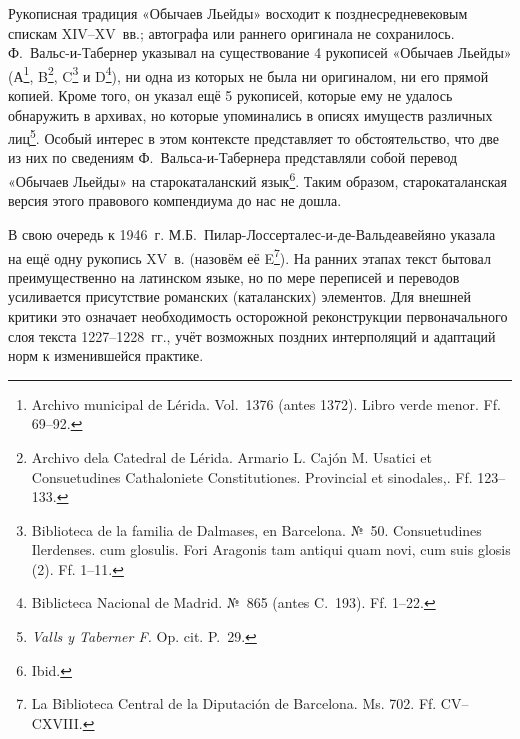 Рукописная традиция «Обычаев Льейды» восходит к позднесредневековым спискам XIV--XV~вв.; автографа или раннего оригинала не сохранилось. Ф.~Вальс-и-Табернер указывал на существование 4 рукописей «Обычаев Льейды» (А\footnote{Archivo municipal de Lérida. Vol.~1376 (antes 1372). Libro verde menor. Ff. 69--92.}, B\footnote{Archivo dela Catedral de Lérida. Armario L. Cajón M. Usatici et Consuetudines Cathaloniete Constitutiones. Provincial et sinodales,. Ff. 123--133.}, C\footnote{Biblioteca de la familia de Dalmases, en Barcelona. №~50. Consuetudines Ilerdenses. cum glosulis. Fori Aragonis tam antiqui quam novi, cum suis glosis (2). Ff. 1--11.} и D\footnote{Biblicteca Nacional de Madrid. №~865 (antes C.~193). Ff. 1--22.}), ни одна из которых не была ни оригиналом, ни его прямой копией. Кроме того, он указал ещё 5 рукописей, которые ему не удалось обнаружить в архивах, но которые упоминались в описях имуществ различных лиц\footnote{\emph{Valls y Taberner F.} Op. cit. P.~29.}. Особый интерес в этом контексте представляет то обстоятельство, что две из них по сведениям Ф.~Вальса-и-Табернера представляли собой перевод «Обычаев Льейды» на старокаталанский язык\footnote{Ibid.}. Таким образом, старокаталанская версия этого правового компендиума до нас не дошла.

В свою очередь к 1946~г. М.Б.~Пилар-Лоссерталес-и-де-Вальдеавейяно указала на ещё одну рукопись XV~в. (назовём её E\footnote{La Biblioteca Central de la Diputación de Barcelona. Ms. 702. Ff. CV--CXVIII.}). На ранних этапах текст бытовал преимущественно на латинском языке, но по мере переписей и переводов усиливается присутствие романских (каталанских) элементов. Для внешней критики это означает необходимость осторожной реконструкции первоначального слоя текста 1227--1228~гг., учёт возможных поздних интерполяций и адаптаций норм к изменившейся практике.

